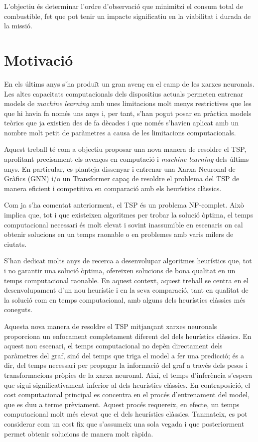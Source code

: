 \documentclass[a4paper,12pt,twoside]{ThesisStyle}
\begin{document}
L'objectiu és determinar l'ordre d'observació que minimitzi el consum total de combustible, fet que pot tenir un impacte significatiu en la viabilitat i durada de la missió.


\section{Motivació}
\label{Motivació}

En els últims anys s'ha produït un gran avenç en el camp de les xarxes neuronals. Les altes capacitats computacionals dels dispositius actuals permeten entrenar models de \textit{machine learning} amb unes limitacions molt menys restrictives que les que hi havia fa només uns anys i, per tant, s'han pogut posar en pràctica models teòrics que ja existien des de fa dècades i que només s'havien aplicat amb un nombre molt petit de paràmetres a causa de les limitacions computacionals.

\medskip

Aquest treball té com a objectiu proposar una nova manera de resoldre el TSP, aprofitant precisament els avenços en computació i \textit{machine learning} dels últims anys. En particular, es planteja dissenyar i entrenar una Xarxa Neuronal de Gràfics (GNN) i/o un Transformer capaç de resoldre el problema del TSP de manera eficient i competitiva en comparació amb els heurístics clàssics.

\medskip

Com ja s'ha comentat anteriorment, el TSP és un problema NP-complet. Això implica que, tot i que existeixen algoritmes per trobar la solució òptima, el temps computacional necessari és molt elevat i sovint inassumible en escenaris on cal obtenir solucions en un temps raonable o en problemes amb varis milers de ciutats.

\medskip

S'han dedicat molts anys de recerca a desenvolupar algoritmes heurístics que, tot i no garantir una solució òptima, ofereixen solucions de bona qualitat en un temps computacional raonable. En aquest context, aquest treball se centra en el desenvolupament d'un nou heurístic i en la seva comparació, tant en qualitat de la solució com en temps computacional, amb alguns dels heurístics clàssics més coneguts.

\medskip

Aquesta nova manera de resoldre el TSP mitjançant xarxes neuronals proporciona un enfocament completament diferent del dels heurístics clàssics. En aquest nou escenari, el temps computacional no depèn directament dels paràmetres del graf, sinó del temps que triga el model a fer una predicció; és a dir, del temps necessari per propagar la informació del graf a través dels pesos i transformacions pròpies de la xarxa neuronal. Així, el temps d'inferència s'espera que sigui significativament inferior al dels heurístics clàssics. En contraposició, el cost computacional principal es concentra en el procés d'entrenament del model, que es duu a terme prèviament. Aquest procés requereix, en efecte, un temps computacional molt més elevat que el dels heurístics clàssics. Tanmateix, es pot considerar com un cost fix que s'assumeix una sola vegada i que posteriorment permet obtenir solucions de manera molt ràpida.
\end{document}
